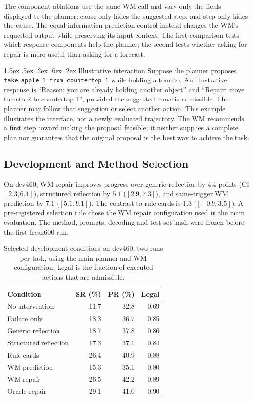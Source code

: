 \documentclass[runningheads]{llncs}
\makeatletter
\renewcommand\paragraph{\@startsection{paragraph}{4}{\z@}%
  {1.5ex \@plus .5ex \@minus .2ex}%
  {.6ex \@plus .2ex}%
  {\normalfont\normalsize\bfseries}}
\makeatother
\begin{document}
The component ablations use the same WM call and vary only the fields displayed to the planner: cause-only hides the suggested step, and step-only hides the cause. The equal-information prediction control instead changes the WM's requested output while preserving its input context. The first comparison tests which response components help the planner; the second tests whether asking for repair is more useful than asking for a forecast.

\paragraph{Illustrative interaction}
Suppose the planner proposes \texttt{take apple 1 from countertop 1} while holding a tomato. An illustrative response is ``Reason: you are already holding another object'' and ``Repair: move tomato 2 to countertop 1'', provided the suggested move is admissible. The planner may follow that suggestion or select another action. This example illustrates the interface, not a newly evaluated trajectory. The WM recommends a first step toward making the proposal feasible; it neither supplies a complete plan nor guarantees that the original proposal is the best way to achieve the task.

\subsection{Development and Method Selection}
On dev460, WM repair improves progress over generic reflection by $4.4$ points (CI $[2.3,6.4]$), structured reflection by $5.1$ ($[2.9,7.3]$), and same-trigger WM prediction by $7.1$ ($[5.1,9.1]$). The contrast to rule cards is $1.3$ ($[-0.9,3.5]$). A pre-registered selection rule chose the WM repair configuration used in the main evaluation. The method, prompts, decoding and test-set hash were frozen before the first fresh600 run.

\begin{table}[tbp]
\caption{Selected development conditions on dev460, two runs per task, using the main planner and WM configuration. Legal is the fraction of executed actions that are admissible.}
\label{tab:development}\centering
\begin{tabular}{lrrr}\toprule
Condition & SR (\%) & PR (\%) & Legal\\\midrule
No intervention & 11.7 & 32.8 & 0.69\\
Failure only & 18.3 & 36.7 & 0.85\\
Generic reflection & 18.7 & 37.8 & 0.86\\
Structured reflection & 17.3 & 37.1 & 0.84\\
Rule cards & 26.4 & 40.9 & 0.88\\
WM prediction & 15.3 & 35.1 & 0.80\\
WM repair & 26.5 & 42.2 & 0.89\\
Oracle repair & 29.1 & 41.0 & 0.90\\\bottomrule
\end{tabular}
\end{table}
\end{document}
